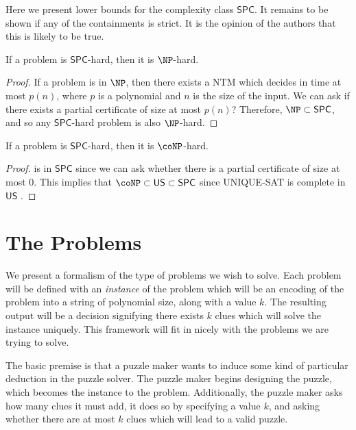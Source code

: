 \documentclass[runningheads,a4paper]{llncs}
\begin{document}
Here we present lower bounds for the complexity class $\mathsf{SPC}$. It remains to be shown if any of the containments is strict. It is the opinion of the authors that this is likely to be true. 

\begin{proposition}
If a problem is $\mathsf{SPC}$-hard, then it is $\NP$-hard.
\end{proposition}

\begin{proof}
If a problem is in $\NP$, then there exists a NTM which decides in time at most $p(n)$, where $p$ is a polynomial and $n$ is the size of the input. We can ask if there exists a partial certificate of size at most $p(n)$? Therefore, $\NP \subset \mathsf{SPC}$, and so any $\mathsf{SPC}$-hard problem is also $\NP$-hard. 
\end{proof}

\begin{proposition}
If a problem is $\mathsf{SPC}$-hard, then it is $\coNP$-hard. 
\end{proposition}

\begin{proof}
 is in $\mathsf{SPC}$ since we can ask whether there is a partial certificate of size at most $0$. This implies that $\coNP \subset \mathsf{US} \subset \mathsf{SPC}$ since UNIQUE-SAT is complete in $\mathsf{US}$ \cite{blass1982unique}.
\end{proof}

\section{The Problems}
\label{sec:The Problems}

We present a formalism of the type of problems we wish to solve. Each problem will be defined with an \emph{instance} of the problem which will be an encoding of the problem into a string of polynomial size, along with a value $k$. The resulting output will be a decision signifying there exists $k$ clues which will solve the instance uniquely. This framework will fit in nicely with the problems we are trying to solve.

The basic premise is that a puzzle maker wants to induce some kind of particular deduction in the puzzle solver. The puzzle maker begins designing the puzzle, which becomes the instance to the problem. Additionally, the puzzle maker asks how many clues it must add, it does so by specifying a value $k$, and asking whether there are at most $k$ clues which will lead to a valid puzzle.
\end{document}
